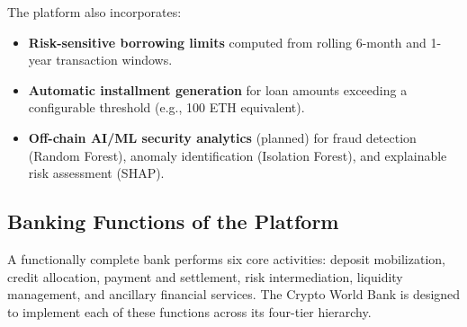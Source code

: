 \documentclass[12pt,a4paper]{report}
\begin{document}
The platform also incorporates:

\begin{itemize}[noitemsep]
\item \textbf{Risk-sensitive borrowing limits} computed from rolling 6-month and 1-year transaction windows.
\item \textbf{Automatic installment generation} for loan amounts exceeding a configurable threshold (e.g., 100 ETH equivalent).
\item \textbf{Off-chain AI/ML security analytics} (planned) for fraud detection (Random Forest), anomaly identification (Isolation Forest), and explainable risk assessment (SHAP).
\end{itemize}

\subsection{Banking Functions of the Platform}

A functionally complete bank performs six core activities: deposit mobilization, credit allocation, payment and settlement, risk intermediation, liquidity management, and ancillary financial services. The Crypto World Bank is designed to implement each of these functions across its four-tier hierarchy.
\end{document}
